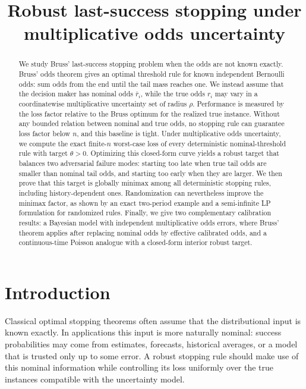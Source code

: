 \documentclass[11pt,a4paper]{article}
\title{Robust last-success stopping under\\ multiplicative odds uncertainty}
\author{}
\date{}
\begin{document}
\maketitle


\begin{abstract}
We study Bruss' last-success stopping problem when the odds are not known
exactly.  Bruss' odds theorem gives an optimal threshold rule for known
independent Bernoulli odds: sum odds from the end until the tail mass reaches
one.  We instead assume that the decision maker has nominal odds \(\bar r_i\),
while the true odds \(r_i\) may vary in a coordinatewise multiplicative
uncertainty set of radius \(\rho\).  Performance is measured by the loss factor
relative to the Bruss optimum for the realized true instance.  Without any
bounded relation between nominal and true odds, no stopping rule can guarantee
loss factor below \(n\), and this baseline is tight.  Under multiplicative odds
uncertainty, we compute the exact finite-\(n\) worst-case loss of every
deterministic nominal-threshold rule with target \(\theta>0\).  Optimizing this
closed-form curve yields a robust target that balances two adversarial failure
modes: starting too late when true tail odds are smaller than nominal tail odds,
and starting too early when they are larger.  We then prove that this target is
globally minimax among all deterministic stopping rules, including
history-dependent ones.  Randomization can nevertheless improve the minimax
factor, as shown by an exact two-period example and a semi-infinite LP
formulation for randomized rules.  Finally, we give two complementary
calibration results: a Bayesian model with independent multiplicative odds
errors, where Bruss' theorem applies after replacing nominal odds by effective
calibrated odds, and a continuous-time Poisson analogue with a closed-form
interior robust target.
\end{abstract}

\section{Introduction}
\label{sec:intro}
Classical optimal stopping theorems often assume that the distributional input
is known exactly.  In applications this input is more naturally nominal: success
probabilities may come from estimates, forecasts, historical averages, or a
model that is trusted only up to some error.  A robust stopping rule should make
use of this nominal information while controlling its loss uniformly over the
true instances compatible with the uncertainty model.
\end{document}
